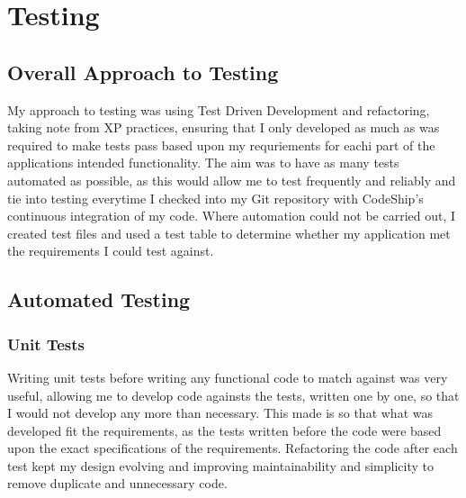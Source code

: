 \chapter{Testing}




\section{Overall Approach to Testing}
My approach to testing was using Test Driven Development and refactoring, taking note from XP practices, ensuring that I only developed as much as was required to make tests pass based upon my requriements for eachi part of the applications intended functionality. The aim was to have as many tests automated as possible, as this would allow me to test frequently and reliably and tie into testing everytime I checked into my Git repository with CodeShip's continuous integration of my code. Where automation could not be carried out, I created test files and used a test table to determine whether my application met the requirements I could test against.


\section{Automated Testing}
\subsection{Unit Tests}
Writing unit tests before writing any functional code to match against was very useful, allowing me to develop code againsts the tests, written one by one, so that I would not develop any more than necessary. This made is so that what was developed fit the requirements, as the tests written before the code were based upon the exact specifications of the requirements. Refactoring the code after each test kept my design evolving and improving maintainability and simplicity to remove duplicate and unnecessary code.

